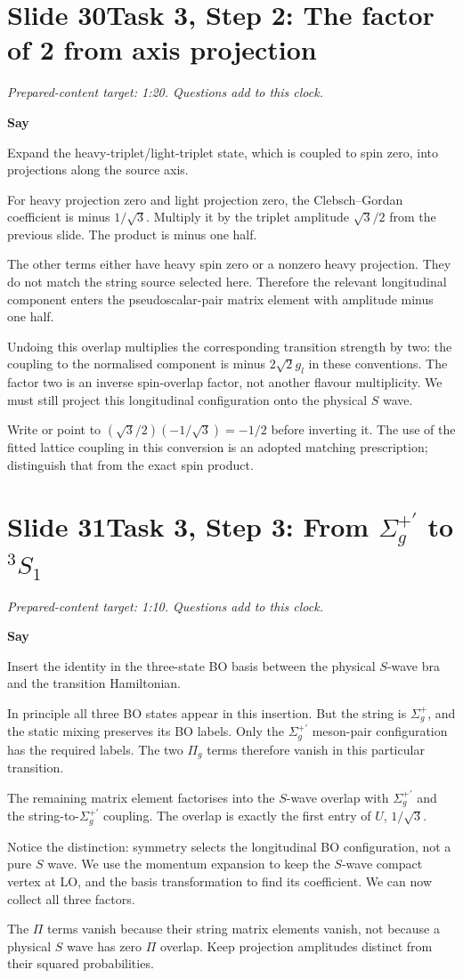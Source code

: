 \documentclass[11pt,a4paper]{article}
\newcommand{\Sigmap}{\Sigma_g^{+\prime}}
\newcommand{\cue}[1]{\begin{private}#1\end{private}}
\newenvironment{speech}{\par\textbf{Say}\par}{\par}
\newcommand{\slidenote}[3]{%
  \clearpage
  \pdfbookmark[1]{Slide #1}{slide-#1}%
  \section*{Slide #1\quad #2}
  \textit{Prepared-content target: #3. Questions add to this clock.}\par
}
\begin{document}
\slidenote{30}{Task 3, Step 2: The factor of 2 from axis projection}{1:20}
\begin{speech}
Expand the heavy-triplet/light-triplet state, which is coupled to
spin zero, into projections along the source axis.

For heavy projection zero and light projection zero, the
Clebsch--Gordan coefficient is minus $1/\sqrt3$. Multiply it
by the triplet amplitude $\sqrt3/2$ from the previous slide.
The product is minus one half.

The other terms either have heavy spin zero or a nonzero heavy
projection. They do not match the string source selected here.
Therefore the relevant longitudinal component enters the
pseudoscalar-pair matrix element with amplitude minus one half.

Undoing this overlap multiplies the corresponding transition
strength by two: the coupling to the normalised component is
minus $2\sqrt2g_l$ in these conventions. The factor two is
an inverse spin-overlap factor, not another flavour multiplicity.
We must still project this longitudinal configuration onto the
physical $S$ wave.
\end{speech}
\cue{Write or point to $(\sqrt3/2)(-1/\sqrt3)=-1/2$ before inverting it.
The use of the fitted lattice coupling in this conversion is an adopted
matching prescription; distinguish that from the exact spin product.}

\slidenote{31}{Task 3, Step 3: From $\Sigmap$ to ${}^3S_1$}{1:10}
\begin{speech}
Insert the identity in the three-state BO basis between the
physical $S$-wave bra and the transition Hamiltonian.

In principle all three BO states appear in this insertion. But
the string is $\Sigma_g^+$, and the static mixing preserves
its BO labels. Only the $\Sigmap$ meson-pair configuration
has the required labels. The two $\Pi_g$ terms therefore vanish
in this particular transition.

The remaining matrix element factorises into the $S$-wave overlap
with $\Sigmap$ and the string-to-$\Sigmap$ coupling. The overlap
is exactly the first entry of $U$, $1/\sqrt3$.

Notice the distinction: symmetry selects the longitudinal BO
configuration, not a pure $S$ wave. We use the momentum expansion
to keep the $S$-wave compact vertex at LO, and the basis transformation
to find its coefficient. We can now collect all three factors.
\end{speech}
\cue{The $\Pi$ terms vanish because their string matrix elements vanish,
not because a physical $S$ wave has zero $\Pi$ overlap. Keep projection
amplitudes distinct from their squared probabilities.}
\end{document}
